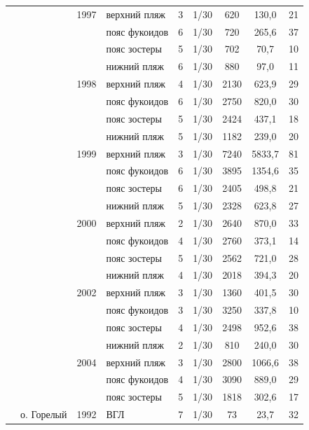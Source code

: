\begin{footnotesize}
\begin{longtable}{|p{2cm}|p{3cm}|p{1cm}|p{2cm}|p{1.5cm}|p{1cm}|*{3}{c|}}
		 &  & 1997 & верхний пляж & 3 & 1/30 & 620 & 130,0 & 21
		\\ \cline{4-9}
		 &  &  & пояс фукоидов & 6 & 1/30 & 720 & 265,6 & 37
		\\ \cline{4-9}
		 &  &  & пояс зостеры & 5 & 1/30 & 702 & 70,7 & 10
		\\ \cline{4-9}
		 &  &  & нижний пляж & 6 & 1/30 & 880 & 97,0 & 11
		\\ \cline{3-9}
		 &  & 1998 & верхний пляж & 4 & 1/30 & 2130 & 623,9 & 29
		\\ \cline{4-9}
		 &  &  & пояс фукоидов & 6 & 1/30 & 2750 & 820,0 & 30
		\\ \cline{4-9}
		 &  &  & пояс зостеры & 5 & 1/30 & 2424 & 437,1 & 18
		\\ \cline{4-9}
		 &  &  & нижний пляж & 5 & 1/30 & 1182 & 239,0 & 20
		\\ \cline{3-9}
		 &  & 1999 & верхний пляж & 3 & 1/30 & 7240 & 5833,7 & 81
		\\ \cline{4-9}
		 &  &  & пояс фукоидов & 6 & 1/30 & 3895 & 1354,6 & 35
		\\ \cline{4-9}
		 &  &  & пояс зостеры & 6 & 1/30 & 2405 & 498,8 & 21
		\\ \cline{4-9}
		 &  &  & нижний пляж & 5 & 1/30 & 2328 & 623,8 & 27
		\\ \cline{3-9}
		 &  & 2000 & верхний пляж & 2 & 1/30 & 2640 & 870,0 & 33
		\\ \cline{4-9}
		 &  &  & пояс фукоидов & 4 & 1/30 & 2760 & 373,1 & 14
		\\ \cline{4-9}
		 &  & & пояс зостеры & 5 & 1/30 & 2562 & 721,0 & 28
		\\ \cline{4-9}
		 &  &  & нижний пляж & 4 & 1/30 & 2018 & 394,3 & 20
		\\ \cline{3-9}
		 &  & 2002 & верхний пляж & 3 & 1/30 & 1360 & 401,5 & 30
		\\ \cline{4-9}
		 &  &  & пояс фукоидов & 3 & 1/30 & 3250 & 337,8 & 10
		\\ \cline{4-9}
		 &  &  & пояс зостеры & 4 & 1/30 & 2498 & 952,6 & 38
		\\ \cline{4-9}
		 &  &  & нижний пляж & 2 & 1/30 & 810 & 240,0 & 30
		\\ \cline{3-9}
		 &  & 2004 & верхний пляж & 3 & 1/30 & 2800 & 1066,6 & 38
		\\ \cline{4-9}
		 &  &  & пояс фукоидов & 4 & 1/30 & 3090 & 889,0 & 29
		\\ \cline{4-9}
		 &  &  & пояс зостеры & 5 & 1/30 & 1818 & 302,6 & 17
		\\ \cline{2-9}
		 & о. Горелый & 1992 & ВГЛ & 7 & 1/30 & 73 & 23,7 & 32

\end{longtable}
\end{footnotesize}
